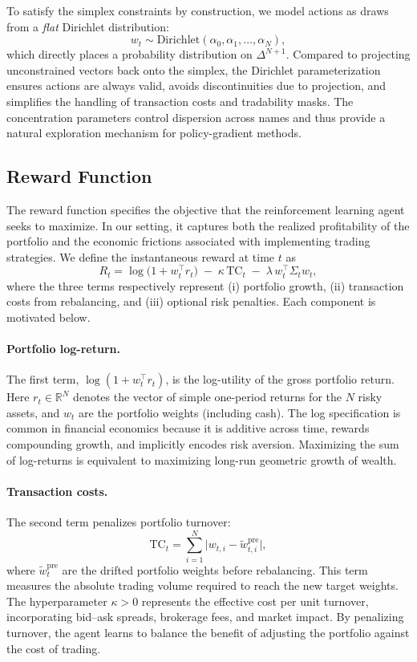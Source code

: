 \documentclass[10pt,leqno]{amsart}
\begin{document}
To satisfy the simplex constraints by construction, we model actions as draws from a \emph{flat} Dirichlet distribution:
\[
w_t \sim \mathrm{Dirichlet}(\alpha_0,\alpha_1,\dots,\alpha_N),
\]
which directly places a probability distribution on $\Delta^{N+1}$. Compared to projecting unconstrained vectors back onto the simplex, the Dirichlet parameterization ensures actions are always valid, avoids discontinuities due to projection, and simplifies the handling of transaction costs and tradability masks. The concentration parameters control dispersion across names and thus provide a natural exploration mechanism for policy-gradient methods.

\subsection{Reward Function}

The reward function specifies the objective that the reinforcement learning agent seeks to maximize. In our setting, it captures both the realized profitability of the portfolio and the economic frictions associated with implementing trading strategies. We define the instantaneous reward at time $t$ as
\[
R_t = \log\!\big(1 + w_t^\top r_t \big) \;-\; \kappa \, \text{TC}_t \;-\; \lambda \, w_t^\top \Sigma_t w_t,
\]
where the three terms respectively represent (i) portfolio growth, (ii) transaction costs from rebalancing, and (iii) optional risk penalties. Each component is motivated below.

\paragraph{Portfolio log-return.}
The first term, $\log(1 + w_t^\top r_t)$, is the log-utility of the gross portfolio return. Here $r_t \in \mathbb{R}^N$ denotes the vector of simple one-period returns for the $N$ risky assets, and $w_t$ are the portfolio weights (including cash). The log specification is common in financial economics because it is additive across time, rewards compounding growth, and implicitly encodes risk aversion. Maximizing the sum of log-returns is equivalent to maximizing long-run geometric growth of wealth.

\paragraph{Transaction costs.}
The second term penalizes portfolio turnover:
\[
\text{TC}_t = \sum_{i=1}^N \big|w_{t,i} - \tilde{w}_{t,i}^{\text{pre}}\big|,
\]
where $\tilde{w}_{t}^{\text{pre}}$ are the drifted portfolio weights before rebalancing. This term measures the absolute trading volume required to reach the new target weights. The hyperparameter $\kappa > 0$ represents the effective cost per unit turnover, incorporating bid--ask spreads, brokerage fees, and market impact. By penalizing turnover, the agent learns to balance the benefit of adjusting the portfolio against the cost of trading.
\end{document}
